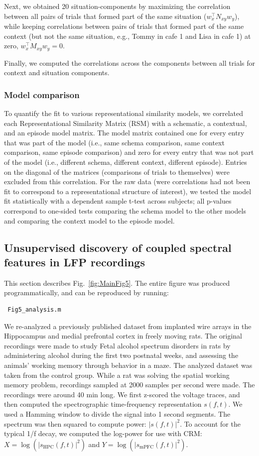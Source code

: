 \documentclass{article}
\begin{document}
Next, we obtained 20 situation-components by maximizing the correlation between all pairs of trials that formed part of the same situation ($w_x^\top N_{xy} w_y$), while keeping correlations between pairs of trials that formed part of the same context (but not the same situation, e.g., Tommy in cafe 1 and Lisa in cafe 1) at zero, $w_x^\top M_{xy} w_y = 0$.

Finally, we computed the correlations across the components between all trials for context and situation components.

\subsubsection*{Model comparison}
To quantify the fit to various representational similarity models, we correlated each Representational Similarity Matrix (RSM) with a schematic, a contextual, and an episode model matrix. The model matrix contained one for every entry that was part of the model (i.e., same schema comparison, same context comparison, same episode comparison) and zero for every entry that was not part of the model (i.e., different schema, different context, different episode). Entries on the diagonal of the matrices (comparisons of trials to themselves) were excluded from this correlation. For the raw data (were correlations had not been fit to correspond to a representational structure of interest), we tested the model fit statistically with a dependent sample t-test across subjects; all p-values correspond to one-sided tests comparing the schema model to the other models and comparing the context model to the episode model.

\subsection*{Unsupervised discovery of coupled spectral features in LFP recordings}

This section describes Fig.~\ref{fig:MainFig5}. The entire figure was produced programmatically, and can be reproduced by running:
\begin{verbatim} Fig5_analysis.m \end{verbatim}

We re-analyzed a previously published dataset\cite{rosenblumChoiceBehaviorsPrefrontal2025a} from implanted wire arrays in the Hippocampus and medial prefrontal cortex in freely moving rats. The original recordings were made to study Fetal alcohol spectrum disorders in rats by administering alcohol during the first two postnatal weeks, and assessing the animals' working memory through behavior in a maze. The analyzed dataset was taken from the control group. While a rat was solving the spatial working memory problem, recordings sampled at 2000 samples per second were made. The recordings were around 40 min long. We first z-scored the voltage traces, and then computed the spectrographic time-frequency representation $s(f,t)$. We used a Hamming window to divide the signal into 1 second segments. The spectrum was then squared to compute power: $|s(f,t)|^2$. To account for the typical 1/f decay, we computed the log-power for use with CRM: $X=\log( |s_{\text{HPC}}(f,t)|^2)$ and $Y=\log(|s_{\text{mPFC}}(f,t)|^2)$.
\end{document}
